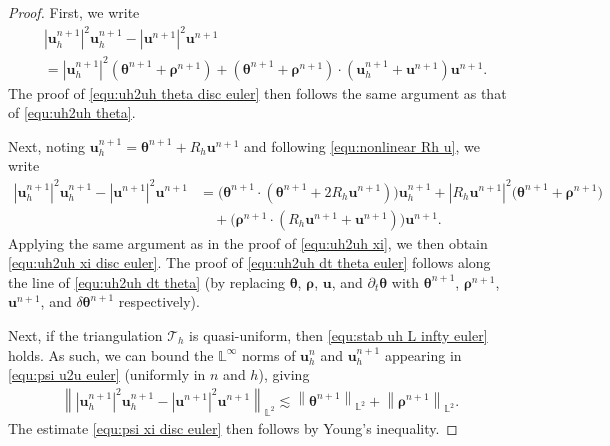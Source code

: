 \documentclass[11pt, reqno]{amsart}
\theoremstyle{definition}
\theoremstyle{remark}
\numberwithin{equation}{section}
\newcommand{\bff}{\boldsymbol}
\newcommand{\bb}{\mathbb}
\newcommand{\norm}[2]{\left\|{#1}\right\|_{#2}}
\newcommand{\abs}[1]{\left|{#1}\right|}
\begin{document}
\begin{proof}
	First, we write
	\begin{align}\label{equ:psi u2u euler}
		\nonumber
		&\abs{\bff{u}_h^{n+1}}^2 \bff{u}_h^{n+1}  - \abs{\bff{u}^{n+1}}^2 \bff{u}^{n+1}
		\\
		&=
		\abs{\bff{u}_h^{n+1}}^2  \left(\bff{\theta}^{n+1} + \bff{\rho}^{n+1}\right) 
		+
		\left(\bff{\theta}^{n+1} + \bff{\rho}^{n+1}\right) \cdot \left( \bff{u}_h^{n+1}+ \bff{u}^{n+1} \right)  \bff{u}^{n+1}.
	\end{align}
	The proof of \eqref{equ:uh2uh theta disc euler} then follows the same argument as that of \eqref{equ:uh2uh theta}.

	Next, noting $\bff{u}_h^{n+1}=\bff{\theta}^{n+1}+ R_h \bff{u}^{n+1}$ and following \eqref{equ:nonlinear Rh u}, we write
	\begin{align}\label{equ:uhn2 minus un2}
		\nonumber
		\abs{\bff{u}_h^{n+1}}^2 \bff{u}_h^{n+1}  - \abs{\bff{u}^{n+1}}^2 \bff{u}^{n+1}
		&=
		\big(\bff{\theta}^{n+1} \cdot (\bff{\theta}^{n+1}+ 2 R_h \bff{u}^{n+1}) \big) \bff{u}_h^{n+1}
		+
		\abs{R_h \bff{u}^{n+1}}^2 \big(\bff{\theta}^{n+1}+\bff{\rho}^{n+1}\big)
		\\
		&\quad
		+
		\big( \bff{\rho}^{n+1} \cdot (R_h \bff{u}^{n+1} + \bff{u}^{n+1}) \big) \bff{u}^{n+1}.
	\end{align}
	Applying the same argument as in the proof of \eqref{equ:uh2uh xi}, we then obtain \eqref{equ:uh2uh xi disc euler}. The proof of \eqref{equ:uh2uh dt theta euler} follows along the line of \eqref{equ:uh2uh dt theta} (by replacing $\bff{\theta}$, $\bff{\rho}$, $\bff{u}$, and $\partial_t \bff{\theta}$ with $\bff{\theta}^{n+1}$, $\bff{\rho}^{n+1}$, $\bff{u}^{n+1}$, and $\delta \bff{\theta}^{n+1}$ respectively).

	Next, if the triangulation $\mathcal{T}_h$ is quasi-uniform, then \eqref{equ:stab uh L infty euler} holds. As such, we can bound the $\bb{L}^\infty$ norms of $\bff{u}_h^n$ and $\bff{u}_h^{n+1}$ appearing in \eqref{equ:psi u2u euler} (uniformly in $n$ and $h$), giving
	\begin{align*}
		\norm{\abs{\bff{u}_h^{n+1}}^2 \bff{u}_h^{n+1}  - \abs{\bff{u}^{n+1}}^2 \bff{u}^{n+1}}{\bb{L}^2}
		\lesssim
		\norm{\bff{\theta}^{n+1}}{\bb{L}^2}
		+ \norm{\bff{\rho}^{n+1}}{\bb{L}^2}.
	\end{align*} 
	The estimate \eqref{equ:psi xi disc euler} then follows by Young's inequality.
	

\end{proof}
\end{document}
